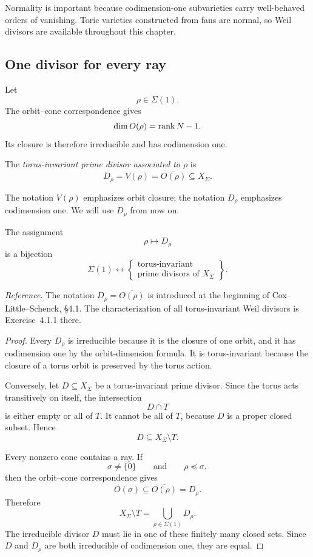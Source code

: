 Normality is important because codimension-one subvarieties carry
well-behaved orders of vanishing. Toric varieties constructed from
fans are normal, so Weil divisors are available throughout this
chapter.

\subsection{One divisor for every ray}

Let
\[
\rho\in\Sigma(1).
\]
The orbit--cone correspondence gives
\[
\dim O(\rho)
=
\operatorname{rank} N-1.
\]
Its closure is therefore irreducible and has codimension one.

\begin{definition}
\label{def:torus-invariant-prime-divisor}
The \emph{torus-invariant prime divisor associated to \(\rho\)} is
\[
D_\rho
=
V(\rho)
=
\overline{O(\rho)}
\subseteq X_\Sigma.
\]
\end{definition}

The notation \(V(\rho)\) emphasizes orbit closure; the notation
\(D_\rho\) emphasizes codimension one. We will use \(D_\rho\) from now
on.

\begin{theorem}
\label{thm:rays-invariant-prime-divisors}
The assignment
\[
\rho\longmapsto D_\rho
\]
is a bijection
\[
\Sigma(1)
\longleftrightarrow
\left\{
\begin{array}{c}
\text{torus-invariant}\\
\text{prime divisors of }X_\Sigma
\end{array}
\right\}.
\]
\end{theorem}

\noindent
\textit{Reference.}
The notation \(D_\rho=\overline{O(\rho)}\) is introduced at the
beginning of Cox--Little--Schenck, \S4.1. The characterization of all
torus-invariant Weil divisors is Exercise~4.1.1 there.

\begin{proof}
Every \(D_\rho\) is irreducible because it is the closure of one
orbit, and it has codimension one by the orbit-dimension formula. It
is torus-invariant because the closure of a torus orbit is preserved
by the torus action.

Conversely, let \(D\subseteq X_\Sigma\) be a torus-invariant prime
divisor. Since the torus acts transitively on itself, the intersection
\[
D\cap T
\]
is either empty or all of \(T\). It cannot be all of \(T\), because
\(D\) is a proper closed subset. Hence
\[
D\subseteq X_\Sigma\setminus T.
\]

Every nonzero cone contains a ray. If
\[
\sigma\neq\{0\}
\qquad\text{and}\qquad
\rho\preceq\sigma,
\]
then the orbit--cone correspondence gives
\[
O(\sigma)\subseteq\overline{O(\rho)}=D_\rho.
\]
Therefore
\[
X_\Sigma\setminus T
=
\bigcup_{\rho\in\Sigma(1)}D_\rho.
\]
The irreducible divisor \(D\) must lie in one of these finitely many
closed sets. Since \(D\) and \(D_\rho\) are both irreducible of
codimension one, they are equal.
\end{proof}

